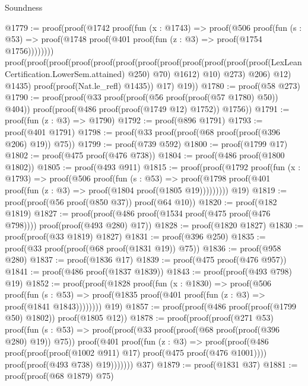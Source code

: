 \begin{lexlean}{Soundness}
\begin{coremodule}
@1779 := proof(proof(@1742
        proof(fun (x : @1743) =>
          proof(@506
              proof(fun (s : @53) =>
                proof(@1748 proof(@401 proof(fun (z : @3) => proof(@1754 @1756))))))))
      proof(proof(proof(proof(proof(proof(proof(proof(proof(proof(proof(proof(LexLeanCertification.LowerSem.attained)
                              @250)
                            @70)
                          @1612)
                        @10)
                      @273)
                    @206)
                  @12)
                @1435)
              proof(proof(Nat.le_refl) @1435))
            @17)
          @19))
@1780 := proof(@58 @273)
@1790 := proof(proof(@33 proof(proof(@56 proof(proof(@57 @1780) @50)) @404))
      proof(proof(@486 proof(proof(@1749 @12) @1752)) @1756))
@1791 := proof(fun (z : @3) => @1790)
@1792 := proof(@896 @1791)
@1793 := proof(@401 @1791)
@1798 := proof(@33 proof(proof(@68 proof(proof(@396 @206) @19)) @75))
@1799 := proof(@739 @592)
@1800 := proof(@1799 @17)
@1802 := proof(@475 proof(@476 @738))
@1804 := proof(@486 proof(@1800 @1802))
@1805 := proof(@493 @911)
@1815 := proof(proof(@1792
        proof(fun (x : @1793) =>
          proof(@506
              proof(fun (s : @53) =>
                proof(@1798 proof(@401 proof(fun (z : @3) => proof(@1804 proof(@1805 @19)))))))))
      @19)
@1819 := proof(proof(@56 proof(@850 @37)) proof(@64 @10))
@1820 := proof(@182 @1819)
@1827 := proof(proof(@486 proof(@1534 proof(@475 proof(@476 @798)))) proof(proof(@493 @280) @17))
@1828 := proof(@1820 @1827)
@1830 := proof(proof(@33 @1819) @1827)
@1831 := proof(@396 @250)
@1835 := proof(@33 proof(proof(@68 proof(@1831 @19)) @75))
@1836 := proof(@958 @280)
@1837 := proof(@1836 @17)
@1839 := proof(@475 proof(@476 @957))
@1841 := proof(@486 proof(@1837 @1839))
@1843 := proof(proof(@493 @798) @19)
@1852 := proof(proof(@1828
        proof(fun (x : @1830) =>
          proof(@506
              proof(fun (s : @53) =>
                proof(@1835 proof(@401 proof(fun (z : @3) => proof(@1841 @1843))))))))
      @19)
@1857 := proof(proof(@486 proof(proof(@1799 @50) @1802)) proof(@1805 @12))
@1878 := proof(proof(proof(@271 @53)
        proof(fun (s : @53) =>
          proof(proof(@33 proof(proof(@68 proof(proof(@396 @280) @19)) @75))
              proof(@401
                  proof(fun (z : @3) =>
                    proof(proof(@486
                          proof(proof(proof(@1002 @911) @17) proof(@475 proof(@476 @1001))))
                        proof(proof(@493 @738) @19)))))))
      @37)
@1879 := proof(@1831 @37)
@1881 := proof(proof(@68 @1879) @75)

\end{coremodule}
\end{lexlean}
